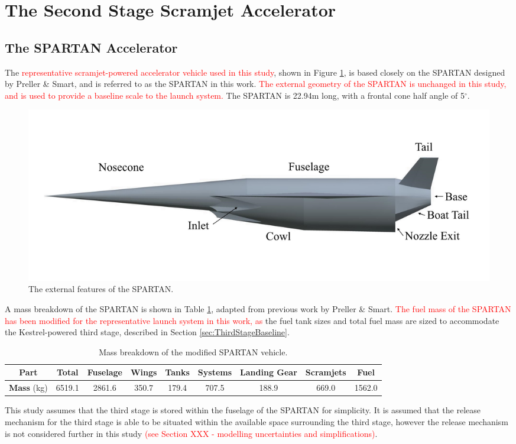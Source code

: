 	
	
	\section{The Second Stage Scramjet Accelerator}\label{sec:SPARTAN}
	
		\subsection{The SPARTAN Accelerator}
		
		The \textcolor{red}{representative scramjet-powered accelerator vehicle used in this study}, shown in Figure \ref{fig:SPARTANlabelled}, is based closely on the SPARTAN designed by Preller \& Smart\cite{Preller2017b}, and is referred to as the SPARTAN in this work. \textcolor{red}{The external geometry of the SPARTAN is unchanged in this study, and is used to provide a baseline scale to the launch system.} The SPARTAN is 22.94m long, with a frontal cone half angle of 5$^\circ$\cite{Preller2017b}. 
		\begin{figure}[ht]
			\centering
			\includegraphics[width=0.7\linewidth]{figures/3_vehicle_design/SPARTANlabelled}
			\caption{The external features of the SPARTAN.}
			\label{fig:SPARTANlabelled}
		\end{figure}
		A mass breakdown of the SPARTAN is shown in Table \ref{tab:MassBreakdown}, adapted from previous work by Preller \& Smart\cite{Preller2017b}. \textcolor{red}{The fuel mass of the SPARTAN has been modified for the representative launch system in this work, as} the fuel tank sizes and total fuel mass are sized to accommodate the Kestrel-powered third stage, described in Section \ref{sec:ThirdStageBaseline}.
		\begin{table}[h]
		\begin{tabular}{|c|c|c|c|c|c|c|c|c|}
			\hline  \textbf{Part} & Total & Fuselage & Wings & Tanks & Systems & Landing Gear & Scramjets & Fuel \\ 
			\hline \textbf{Mass} (kg) & 6519.1 & 2861.6 & 350.7 & 179.4 & 707.5 & 188.9 & 669.0 & 1562.0 \\ 
			\hline 
		\end{tabular} 
		\caption{Mass breakdown of the modified SPARTAN vehicle.}
		\label{tab:MassBreakdown}
		\end{table}
This study assumes that the third stage is stored within the fuselage of the SPARTAN for simplicity. It is assumed that the release mechanism for the third stage is able to be situated within the available space surrounding the third stage, however the release mechanism is not considered further in this study \textcolor{red}{(see Section XXX - modelling uncertainties and simplifications)}. 
		
